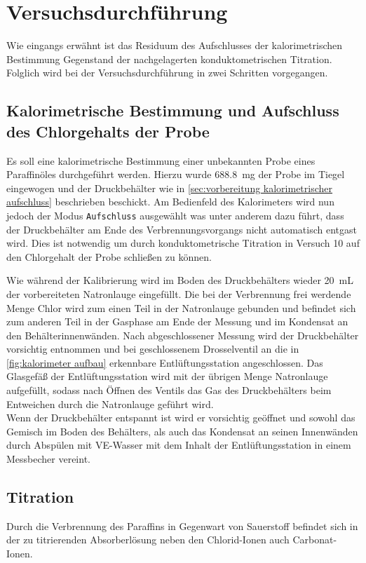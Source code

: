 \chapter{Versuchsdurchführung}
	Wie eingangs erwähnt ist das Residuum des Aufschlusses der kalorimetrischen Bestimmung Gegenstand der nachgelagerten konduktometrischen Titration.
	Folglich wird bei der Versuchsdurchführung in zwei Schritten vorgegangen.
	\section{Kalorimetrische Bestimmung und Aufschluss des Chlorgehalts der Probe}
		Es soll eine kalorimetrische Bestimmung einer unbekannten Probe eines Paraffinöles durchgeführt werden. Hierzu wurde \SI{688,8}{mg} der Probe
		im Tiegel eingewogen und der Druckbehälter wie in \cref{sec:vorbereitung kalorimetrischer aufschluss} beschrieben beschickt. Am Bedienfeld
		des Kalorimeters wird nun jedoch der Modus \texttt{Aufschluss} ausgewählt was unter anderem dazu führt, dass der Druckbehälter am Ende
		des Verbrennungsvorgangs nicht automatisch entgast wird. Dies ist notwendig um durch konduktometrische Titration in Versuch 10
		auf den Chlorgehalt der Probe schließen zu können.\par
		Wie während der Kalibrierung wird im Boden des Druckbehälters wieder \SI{20}{mL} der vorbereiteten Natronlauge eingefüllt. Die bei der Verbrennung frei werdende
		Menge Chlor wird zum einen Teil in der Natronlauge gebunden und befindet sich zum anderen Teil in der Gasphase am Ende der Messung und im
		Kondensat an den Behälterinnenwänden. Nach abgeschlossener Messung wird der Druckbehälter vorsichtig entnommen und bei geschlossenem
		Drosselventil an die in \cref{fig:kalorimeter aufbau} erkennbare Entlüftungsstation angeschlossen. Das Glasgefäß der Entlüftungsstation wird
		mit der übrigen Menge Natronlauge aufgefüllt, sodass nach Öffnen des Ventils das Gas des Druckbehälters beim Entweichen durch
		die Natronlauge geführt wird.\\
		Wenn der Druckbehälter entspannt ist wird er vorsichtig geöffnet und sowohl das Gemisch im Boden des Behälters, als auch das Kondensat an
		seinen Innenwänden durch Abspülen mit VE-Wasser mit dem Inhalt der Entlüftungsstation in einem Messbecher vereint.
	\section{Titration}
		Durch die Verbrennung des Paraffins in Gegenwart von Sauerstoff befindet sich in der zu titrierenden Absorberlösung neben den Chlorid-Ionen
		auch Carbonat-Ionen.